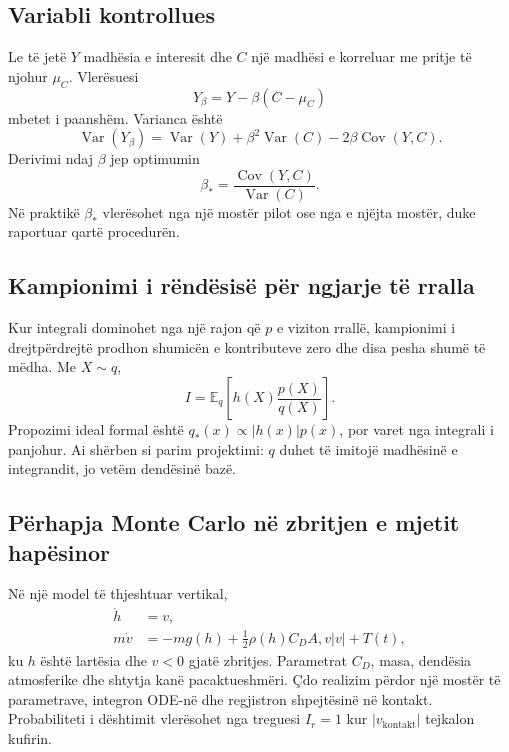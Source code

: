 \documentclass[11pt,oneside,openany]{book}
\newcommand{\E}{\mathbb{E}}
\newcommand{\Var}{\operatorname{Var}}
\newcommand{\Cov}{\operatorname{Cov}}
\begin{document}
\subsection{Variabli kontrollues}
Le të jetë $Y$ madhësia e interesit dhe $C$ një madhësi e korreluar me pritje të njohur $\mu_C$. Vlerësuesi
\begin{equation}
 Y_\beta=Y-\beta(C-\mu_C)
\end{equation}
mbetet i paanshëm. Varianca është
\begin{equation}
 \Var(Y_\beta)=\Var(Y)+\beta^2\Var(C)-2\beta\Cov(Y,C).
\end{equation}
Derivimi ndaj $\beta$ jep optimumin
\begin{equation}
 \beta_*=\frac{\Cov(Y,C)}{\Var(C)}.
\end{equation}
Në praktikë $\beta_*$ vlerësohet nga një mostër pilot ose nga e njëjta mostër, duke raportuar qartë procedurën.

\subsection{Kampionimi i rëndësisë për ngjarje të rralla}
Kur integrali dominohet nga një rajon që $p$ e viziton rrallë, kampionimi i drejtpërdrejtë prodhon shumicën e kontributeve zero dhe disa pesha shumë të mëdha. Me $X\sim q$,
\begin{equation}
 I=\E_q\left[h(X)\frac{p(X)}{q(X)}\right].
\end{equation}
Propozimi ideal formal është $q_*(x)\propto|h(x)|p(x)$, por varet nga integrali i panjohur. Ai shërben si parim projektimi: $q$ duhet të imitojë madhësinë e integrandit, jo vetëm dendësinë bazë.

\subsection{Përhapja Monte Carlo në zbritjen e mjetit hapësinor}
Në një model të thjeshtuar vertikal,
\begin{align}
 \dot h&=v,\\
 m\dot v&=-mg(h)+\tfrac12\rho(h)C_DA,v|v|+T(t),
\end{align}
ku $h$ është lartësia dhe $v<0$ gjatë zbritjes. Parametrat $C_D$, masa, dendësia atmosferike dhe shtytja kanë pacaktueshmëri. Çdo realizim përdor një mostër të parametrave, integron ODE-në dhe regjistron shpejtësinë në kontakt. Probabiliteti i dështimit vlerësohet nga treguesi $I_r=1$ kur $|v_{\mathrm{kontakt}}|$ tejkalon kufirin.
\end{document}
